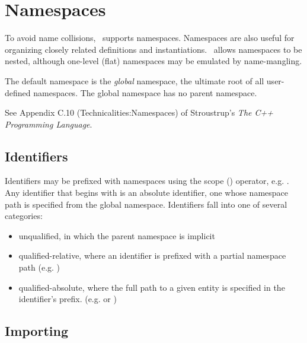 

\chapter{Namespaces}
\label{sec:namespaces}

To avoid name collisions, \artxx\ supports namespaces.  
Namespaces are also useful for organizing closely related definitions
and instantiations.  
\artxx\ allows namespaces to be nested, although one-level (flat)
namespaces may be emulated by name-mangling.  

The default namespace is the \emph{global} namespace, 
the ultimate root of all user-defined namespaces.  
The global namespace has no parent namespace.  

See Appendix C.10 (Technicalities:Namespaces) of 
Stroustrup's \textit{The C++ Programming Language}.  

\section{Identifiers}
\label{sec:namespaces:identifiers}

Identifiers may be prefixed with namespaces using the 
scope (\ttt{::}) operator, e.g. .  
Any identifier that begins with \ttt{::} is an absolute identifier, 
one whose namespace path is specified from the global namespace.  
Identifiers fall into one of several categories:

\begin{itemize}
\item unqualified, in which the parent namespace is implicit
\item qualified-relative, where an identifier is prefixed with a
	partial namespace path (e.g. )
\item qualified-absolute, where the full path to a given entity is 
	specified in the identifier's prefix.  
	(e.g.  or )
\end{itemize}


\section{Importing}
\label{sec:namespaces:import}

